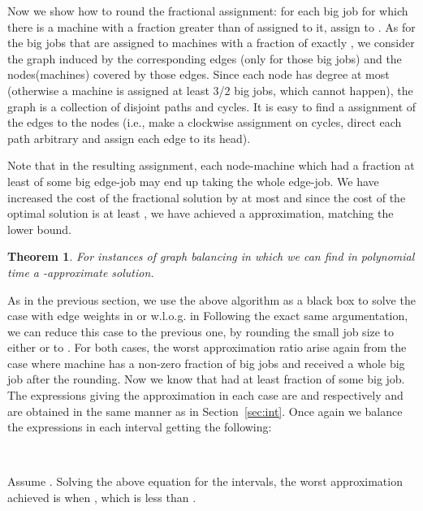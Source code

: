 \documentclass[11pt]{article}\usepackage{amsmath}
\newtheorem{theorem}{Theorem}[section]
\begin{document}
Now we show  how to round the fractional assignment:  for each big job
 for  which there  is a  machine  with  a fraction  greater than
 of   assigned to it, assign   to . As for  the big jobs
that are assigned to  machines with a fraction of exactly , we
consider the graph induced by the corresponding edges (only for those big jobs) and the nodes(machines) covered by those edges. Since
each  node has  degree  at most   (otherwise a machine is assigned at least 3/2 big jobs, which cannot happen),  the graph  is  a collection  of
disjoint paths  and cycles. It is  easy to find a   assignment of
the edges  to the  nodes (i.e., make  a clockwise assignment  on cycles,
direct each path arbitrary and assign each edge to its head).

Note that in the resulting assignment, each node-machine which had a fraction at least  of some big edge-job may end up taking the whole edge-job. We have increased the cost of the fractional solution by  at most and since the cost of the optimal solution is at least , we have achieved a  approximation, matching the lower bound.

\begin{theorem}
For instances of graph balancing in which  we can  find in polynomial time a -approximate solution.
\end{theorem}

As in the previous section, we  use the above algorithm as a black box
to solve the case with edge weights in  or w.l.o.g. in 
Following the exact same  argumentation, we can reduce this case
to the  previous one,  by rounding  the small job  size to  either   or   to  . For both cases, the worst approximation ratio arise again from the case where machine  has a non-zero fraction of big jobs and received a whole big job after the rounding. Now we know that  had at least  fraction of some big job. The
expressions  giving   the  approximation   in  each  case   are 
  and  respectively and are obtained in the same
manner as in Section~\ref{sec:int}. 
Once again we  balance the  expressions in  each
interval  getting the following:

\begin{center}
\\

\end{center}

Assume . Solving the above equation for the intervals, the worst approximation achieved is when , which is less than .
\end{document}

